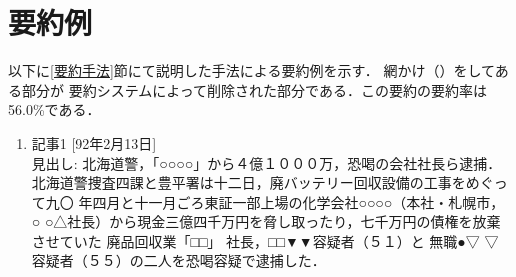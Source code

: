 \section{要約例}
\label{ex_summary}
以下に\ref{要約手法}節にて説明した手法による要約例を示す．
網かけ（\shadedbox{　　}）をしてある部分が
要約システムによって削除された部分である．この要約の要約率は56.0\%である．
\begin{enumerate}
\item 記事1 [92年2月13日]
\\ 
見出し: 北海道警，「○○○○」から４億１０００万，恐喝の会社社長ら逮捕．
\\ 
北海道警捜査四課と豊平署は十二日，廃バッテリー回収設備の工事をめぐって九〇
      年四月と十一月ごろ東証一部上場の化学会社○○○○（本社・札幌市，○
      ○△社長）から現金三億四千万円を脅し取ったり，七千万円の債権を放棄
      させていた
      廃品回収業「□□」
      社長，□□▼▼容疑者（５１）と
      無職●▽
      ▽容疑者（５５）の二人を恐喝容疑で逮捕した．


\end{enumerate}
